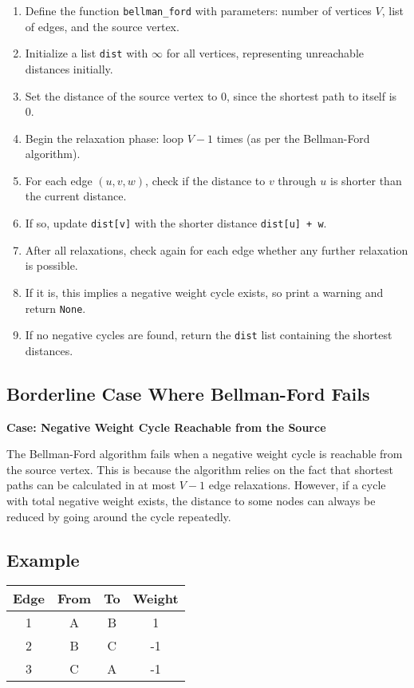 \documentclass[14pt,a4paper]{extarticle}
\begin{document}
\begin{enumerate}[leftmargin=2em,label=\textbf{Line \arabic*:}]
  \item Define the function \texttt{bellman\_ford} with parameters: number of vertices \( V \), list of edges, and the source vertex.
  \item Initialize a list \texttt{dist} with \(\infty\) for all vertices, representing unreachable distances initially.
  \item Set the distance of the source vertex to 0, since the shortest path to itself is 0.
  \item Begin the relaxation phase: loop \( V-1 \) times (as per the Bellman-Ford algorithm).
  \item For each edge \((u, v, w)\), check if the distance to \( v \) through \( u \) is shorter than the current distance.
  \item If so, update \texttt{dist[v]} with the shorter distance \texttt{dist[u] + w}.
  \item After all relaxations, check again for each edge whether any further relaxation is possible.
  \item If it is, this implies a negative weight cycle exists, so print a warning and return \texttt{None}.
  \item If no negative cycles are found, return the \texttt{dist} list containing the shortest distances.
\end{enumerate}

\newpage
\subsection{Borderline Case Where Bellman-Ford Fails}

\textbf{Case: Negative Weight Cycle Reachable from the Source}

The Bellman-Ford algorithm fails when a negative weight cycle is reachable from the source vertex. This is because the algorithm relies on the fact that shortest paths can be calculated in at most \( V - 1 \) edge relaxations. However, if a cycle with total negative weight exists, the distance to some nodes can always be reduced by going around the cycle repeatedly.

\subsection*{Example}

\begin{center}
\begin{tabular}{|c|c|c|c|}
\hline
\textbf{Edge} & \textbf{From} & \textbf{To} & \textbf{Weight} \\
\hline
1 & A & B & 1 \\
2 & B & C & -1 \\
3 & C & A & -1 \\
\hline
\end{tabular}

\end{center}
\end{document}

